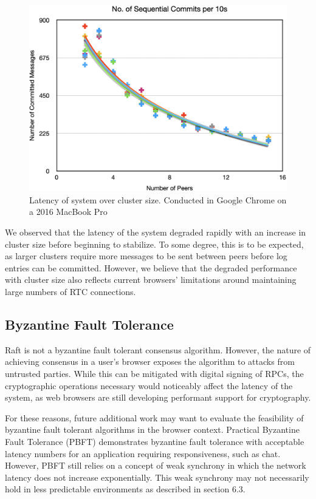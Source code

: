 \documentclass[11pt,twocolumn]{article}
\begin{document}
\begin{figure}[t]
\centering
\includegraphics[scale=0.4]{performance}
\caption{Latency of system over cluster size. Conducted in Google Chrome on a 2016 MacBook Pro}
\label{fig:scale}
\end{figure}

We observed that the latency of the system degraded rapidly with an increase in cluster size before beginning to stabilize. To some degree, this is to be expected, as larger clusters require more messages to be sent between peers before log entries can be committed. However, we believe that the degraded performance with cluster size also reflects current browsers' limitations around maintaining large numbers of RTC connections.

\subsection{Byzantine Fault Tolerance}
Raft is not a byzantine fault tolerant consensus algorithm. However, the nature of achieving consensus in a user's browser exposes the algorithm to attacks from untrusted parties. While this can be mitigated with digital signing of RPCs, the cryptographic operations necessary would noticeably affect the latency of the system, as web browsers are still developing performant support for cryptography.

For these reasons, future additional work may want to evaluate the feasibility of byzantine fault tolerant algorithms in the browser context. Practical Byzantine Fault Tolerance (PBFT) \cite{pbftpaper} demonstrates byzantine fault tolerance with acceptable latency numbers for an application requiring responsiveness, such as chat. However, PBFT still relies on a concept of weak synchrony in which the network latency does not increase exponentially. This weak synchrony may not necessarily hold in less predictable environments as described in section 6.3.
\end{document}

